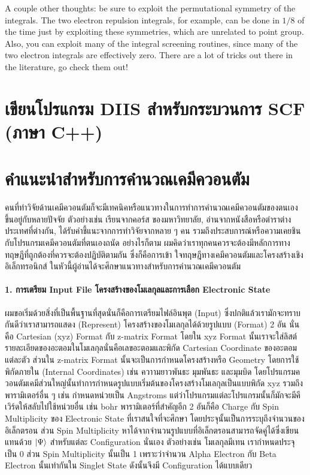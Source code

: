 A couple other thoughts: be sure to exploit the permutational symmetry
of the integrals. The two electron repulsion integrals, for example, can
be done in $1/8$ of the time just by exploiting these symmetries, which
are unrelated to point group. Also, you can exploit many of the integral
screening routines, since many of the two electron integrals are
effectively zero. There are a lot of tricks out there in the literature,
go check them out!

\section{เขียนโปรแกรม DIIS สำหรับกระบวนการ SCF (ภาษา C++)}

\section{คำแนะนำสำหรับการคำนวณเคมีควอนตัม}

คนที่ทำวิจัยด้านเคมีควอนตัมก็จะมีเทคนิคหรือแนวทางในการทำการคำนวณเคมีควอนตัมของตนเอง ขึ้นอยู่กับหลายปัจจัย ตัวอย่างเช่น เรียนจากคอร์ส%
ของมหาวิทยาลัย, อ่านจากหนังสือหรือตำราต่างประเทศที่ต่างกัน, ได้รับคำชี้แนะจากการทำวิจัยจากหลาย ๆ คน รวมถึงประสบการณ์หรือความเคยชิน%
กับโปรแกรมเคมีควอนตัมที่ตนเองถนัด อย่างไรก็ตาม ผมคิดว่าเราทุกคนควรจะต้องมีหลักการทางทฤษฎีที่ถูกต้องที่ควรจะต้องปฏิบัติตามกัน ซึ่งก็คือการเข้า%
ใจทฤษฎีทางเคมีควอนตัมและโครงสร้างเชิงอิเล็กทรอนิกส์ ในหัวนี้ผู้อ่านได้จะศึกษาแนวทางสำหรับการคำนวณเคมีควอนตัม

\paragraph{1. การเตรียม Input File โครงสร้างของโมเลกุลและการเลือก Electronic State}
ผมขอเริ่มด้วยสิ่งที่เป็นพื้นฐานที่สุดนั่นก็คือการเตรียมไฟล์อินพุต (Input) ซึ่งปกติแล้วเรามักจะทราบกันดีว่าเราสามารถแสดง (Represent)
โครงสร้างของโมเลกุลได้ด้วยรูปแบบ (Format) 2 อัน นั่นคือ Cartesian (xyz) Format กับ z-matrix Format โดยใน xyz Format
นั้นเราจะใส่ลิสต์รายละเอียดของอะตอมในโมเลกุลนั่นคือเลขอะตอมและพิกัด Cartesian Coordinate ของอะตอมแต่ละตัว ส่วนใน z-matrix
Format นั้นจะเป็นการกำหนดโครงสร้างหรือ Geometry โดยการใช้พิกัดภายใน (Internal Coordinates) เช่น ควาามยาวพันธะ มุมพันธะ
และมุมบิด โดยโปรแกรมควอนตัมเคมีส่วนใหญ่นั้นทำการกำหนดรูปแบบเริ่มต้นของโครงสร้างโมเลกุลเป็นแบบพิกัด xyz รวมถึงพารามิเตอร์อื่น ๆ
เช่น กำหนดหน่วยเป็น Angstroms แต่ว่าโปรแกรมแต่ละโปรแกรมนั้นก็มักจะมีคีเวิร์ดให้สลับไปใช้หน่วยอื่น เช่น bohr พารามิเตอร์ที่สำคัญอีก 2
อันก็คือ Charge กับ Spin Multiplicity ของ Electronic State ที่เราสนใจที่จะศึกษา โดยประจุนั้นเป็นการระบุถึงจำนวนของอิเล็กตรอน
ส่วน Spin Multiplicity หาได้จากจำนวนรูปแบบที่อิเล็กตรอนสามารถจัดคู่ได้ซึ่งเขียนแทนด้วย $\ket{\Psi}$ สำหรับแต่ละ Configuration
นั่นเอง ตัวอย่างเช่น โมเลกุลมีเทน  เรากำหนดประจุเป็น 0 ส่วน Spin Multiplicity นั้นเป็น 1 เพราะว่าจำนวน Alpha Electron
กับ Beta Electron นั้นเท่ากันใน Singlet State ดังนั้นจึงมี Configuration ได้แบบเดียว

